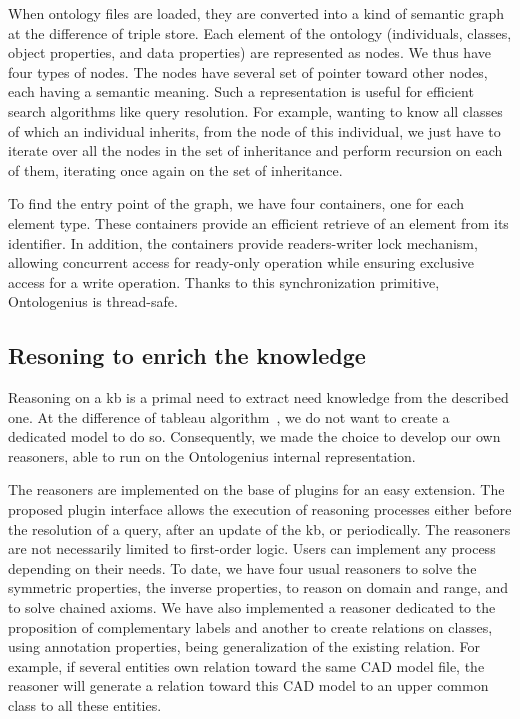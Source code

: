 When ontology files are loaded, they are converted into a kind of semantic graph at the difference of triple store. Each element of the ontology (individuals, classes, object properties, and data properties) are represented as nodes. We thus have four types of nodes. The nodes have several set of pointer toward other nodes, each having a semantic meaning. Such a representation is useful for efficient search algorithms like query resolution. For example, wanting to know all classes of which an individual inherits, from the node of this individual, we just have to iterate over all the nodes in the set of inheritance and perform recursion on each of them, iterating once again on the set of inheritance.

To find the entry point of the graph, we have four containers, one for each element type. These containers provide an efficient retrieve of an element from its identifier. In addition, the containers provide readers-writer lock mechanism, allowing concurrent access for ready-only operation while ensuring exclusive access for a write operation. Thanks to this synchronization primitive, Ontologenius is thread-safe.

\subsection{Resoning to enrich the knowledge}

Reasoning on a \acrlong{kb} is a primal need to extract need knowledge from the described one. At the difference of tableau algorithm~\cite{zuo_2006_high}, we do not want to create a dedicated model to do so. Consequently, we made the choice to develop our own reasoners, able to run on the Ontologenius internal representation.

The reasoners are implemented on the base of plugins for an easy extension. The proposed plugin interface allows the execution of reasoning processes either before the resolution of a query, after an update of the \acrshort{kb}, or periodically. The reasoners are not necessarily limited to first-order logic. Users can implement any process depending on their needs. To date, we have four usual reasoners to solve the symmetric properties, the inverse properties, to reason on domain and range, and to solve chained axioms. We have also implemented a reasoner dedicated to the proposition of complementary labels and another to create relations on classes, using annotation properties, being generalization of the existing relation. For example, if several entities own relation toward the same CAD model file, the reasoner will generate a relation toward this CAD model to an upper common class to all these entities.

